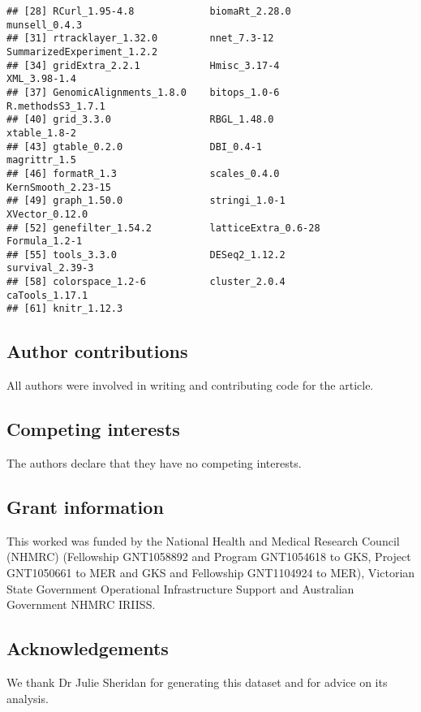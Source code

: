 \documentclass[10pt,a4paper]{extarticle}\usepackage[]{graphicx}\usepackage[]{color}
\makeatletter
\newenvironment{kframe}{%
 \def\at@end@of@kframe{}%
 \ifinner\ifhmode%
  \def\at@end@of@kframe{\end{minipage}}%
  \begin{minipage}{\columnwidth}%
 \fi\fi%
 \def\FrameCommand##1{\hskip\@totalleftmargin \hskip-\fboxsep
 \colorbox{shadecolor}{##1}\hskip-\fboxsep
     \hskip-\linewidth \hskip-\@totalleftmargin \hskip\columnwidth}%
 \MakeFramed {\advance\hsize-\width
   \@totalleftmargin\z@ \linewidth\hsize
   \@setminipage}}%
 {\par\unskip\endMakeFramed%
 \at@end@of@kframe}
\newenvironment{knitrout}{}{} %
\makeatother
\begin{document}
\begin{knitrout}
\begin{kframe}
\begin{verbatim}
## [28] RCurl_1.95-4.8             biomaRt_2.28.0             munsell_0.4.3             
## [31] rtracklayer_1.32.0         nnet_7.3-12                SummarizedExperiment_1.2.2
## [34] gridExtra_2.2.1            Hmisc_3.17-4               XML_3.98-1.4              
## [37] GenomicAlignments_1.8.0    bitops_1.0-6               R.methodsS3_1.7.1         
## [40] grid_3.3.0                 RBGL_1.48.0                xtable_1.8-2              
## [43] gtable_0.2.0               DBI_0.4-1                  magrittr_1.5              
## [46] formatR_1.3                scales_0.4.0               KernSmooth_2.23-15        
## [49] graph_1.50.0               stringi_1.0-1              XVector_0.12.0            
## [52] genefilter_1.54.2          latticeExtra_0.6-28        Formula_1.2-1             
## [55] tools_3.3.0                DESeq2_1.12.2              survival_2.39-3           
## [58] colorspace_1.2-6           cluster_2.0.4              caTools_1.17.1            
## [61] knitr_1.12.3
\end{verbatim}
\end{kframe}
\end{knitrout}

\subsection*{Author contributions}
All authors were involved in writing and contributing code for the article.

\subsection*{Competing interests}
The authors declare that they have no competing interests.

\subsection*{Grant information}
This worked was funded by the National Health and Medical Research Council (NHMRC) (Fellowship GNT1058892 and Program GNT1054618 to GKS, Project GNT1050661 to MER and GKS and Fellowship GNT1104924 to MER), Victorian State Government Operational Infrastructure Support and Australian Government NHMRC IRIISS.

\subsection*{Acknowledgements}
We thank Dr Julie Sheridan for generating this dataset and for advice on its analysis.


\nocite{*}
{\small
}
\end{document}
